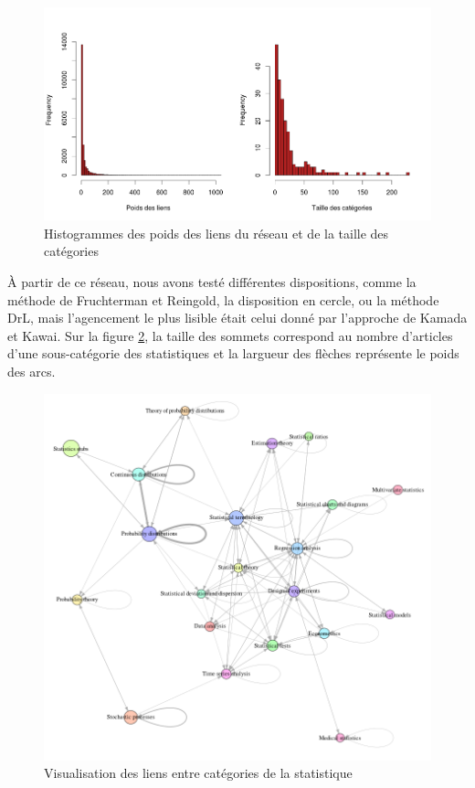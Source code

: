 \documentclass[a4paper]{article}
\begin{document}
\begin{figure}[h!]
   \centering
   \caption{\label{hist-agg} Histogrammes des poids des liens du réseau et de la taille des catégories}
   \includegraphics[scale=0.35]{../images/hist-agg}
\end{figure}

À partir de ce réseau, nous avons testé différentes dispositions, comme la méthode de Fruchterman et Reingold, la disposition en cercle, ou la méthode DrL, mais l'agencement le plus lisible était celui donné par l'approche de Kamada et Kawai. Sur la figure \ref{viz-cat}, la taille des sommets correspond au nombre d'articles d'une sous-catégorie des statistiques et la largueur des flèches représente le poids des arcs.

\begin{figure}[h!]
   \centering
   \caption{\label{viz-cat} Visualisation des liens entre catégories de la statistique}
   \includegraphics[scale=0.5]{../images/categories2}
\end{figure}
\end{document}
